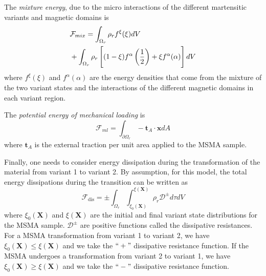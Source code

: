 \begin{multicols}{2}
The \textit{mixture energy}, due to the micro interactions of the different martensitic variants and magnetic domains is
\begin{align} \label{eq:16}
    &\mathcal{F}_{mix} = \int_{\Omega_{r}}\rho_{r}f^{\xi}(\xi)dV \notag \\
    &+ \int_{\Omega_{r}}\rho_{r} \left[(1-\xi)f^{\alpha}\left(\frac{1}{2}\right) + \xi f^{\alpha}(\alpha)\right]dV
\end{align}
where $f^{\xi}(\xi)$ and $f^{\alpha}(\alpha)$ are the energy densities that come from the mixture of the two variant states and the interactions of the different magnetic domains in each variant region.

The \textit{potential energy of mechanical loading} is
\begin{equation} \label{eq:17}
    \mathcal{F}_{ml} = \int_{\partial\Omega_{r}} -\textbf{t}_{A}\cdot \textbf{x} dA
\end{equation}
where $\textbf{t}_{A}$ is the external traction per unit area applied to the MSMA sample.

Finally, one needs to consider energy dissipation during the transformation of the material from variant 1 to variant 2. By assumption, for this model, the total energy dissipations during the transition can be written as
\begin{equation} \label{eq:18}
    \mathcal{F}_\mathrm{dis} = \pm \int_{\Omega_{r}} \int_{\xi_{0}(\textbf{X})}^{\xi(\textbf{X})} \rho_{r}\mathcal{D}^{\pm}d\tau dV
\end{equation}
where $\xi_{0}(\textbf{X})$ and $\xi(\textbf{X})$ are the initial and  final variant state distributions for the MSMA sample. $\mathcal{D}^{\pm}$ are positive functions called the dissipative resistances. For a MSMA transformation from variant 1 to variant 2, we have $\xi_{0}(\textbf{X})\leq\xi(\textbf{X})$ and we take the $``+"$ dissipative resistance function. If the MSMA undergoes a transformation from variant 2 to variant 1, we have $\xi_{0}(\textbf{X}) \geq \xi(\textbf{X})$ and we take the $``-"$ dissipative resistance function.



\end{multicols}
